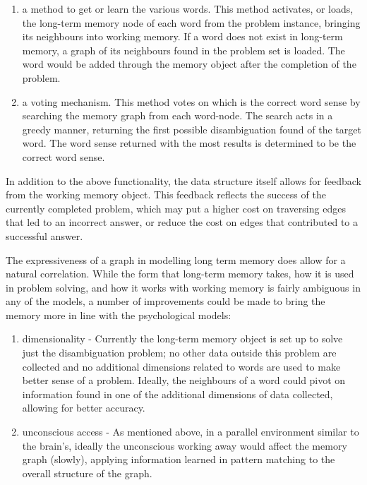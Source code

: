 \begin{enumerate}
	\item a method to get or learn the various words.  This method activates, or loads, the long-term
	memory node of each word from the problem instance, bringing its neighbours into working memory. 
	If a word does not exist in long-term memory, a graph of its neighbours found in the problem set
	is loaded.  The word would be added through the memory object after the completion of the problem.  
	\item a voting mechanism. This method votes on which is the correct word sense by searching the memory
	graph from each word-node. The search acts in a greedy manner, returning the first possible
	disambiguation found of the target word. The word sense returned with the most results is determined 
	to be the correct word sense.

\end{enumerate}

In addition to the above functionality, the data structure itself allows for
feedback from the working memory object.  This feedback reflects the success 
of the currently completed problem, which may put a higher cost on traversing 
edges that led to an incorrect answer, or reduce the cost on edges that contributed 
to a successful answer.

The expressiveness of a graph in modelling long term memory does allow for a
natural correlation. While the form that long-term memory takes, how it is used in
problem solving, and how it works with working memory is fairly ambiguous in any
of the models, a number of improvements could be made to bring the memory more
in line with the psychological models:

\begin{enumerate}     
	\item dimensionality - Currently the long-term memory object is set up to solve just the 
	disambiguation problem; no other data outside this problem are collected 
	and no additional dimensions related to words are used to make better sense 
	of a problem. Ideally, the neighbours of a word could pivot on information 
	found in one of the additional dimensions of data collected, allowing for better 
	accuracy.
	\item unconscious access - As mentioned above, in a parallel environment 
	similar to the brain's, ideally the unconscious working away would affect 
	the memory graph (slowly), applying information learned in pattern matching 
	to the overall structure of the graph.
\end{enumerate}

